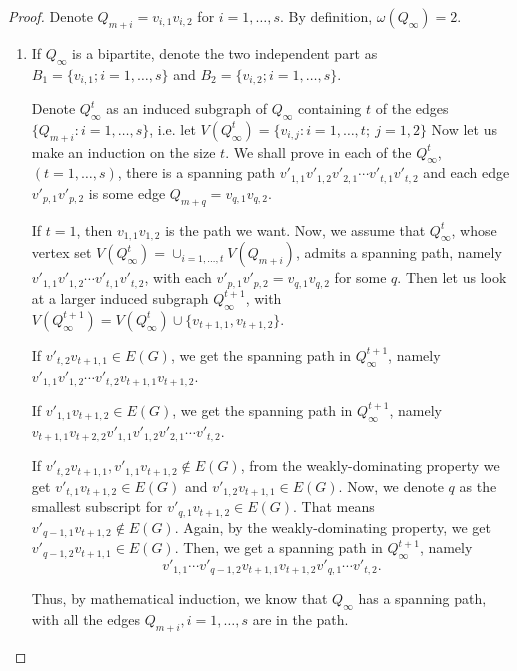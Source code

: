 \documentclass{amsart}
\theoremstyle{definition}
\begin{document}
\begin{proof}
Denote $Q_{m+i}=v_{i,1}v_{i,2}$ for $i=1,\ldots,s$. By definition, $\omega(Q_{\infty})=2$.
\begin{enumerate}
\item If $Q_{\infty}$ is a bipartite, denote the two independent part as $B_1=\{v_{i,1};i=1,\ldots,s\}$ and $B_2=\{v_{i,2};i=1,\ldots,s\}$. 


Denote $Q^t_{\infty}$ as an induced subgraph of $Q_{\infty}$ containing $t$ of the edges $\{Q_{m+i}:i=1,\ldots,s\}$, i.e. let $V(Q^t_{\infty})=\{v_{i,j}:i=1,\ldots,t;~j=1,2\}$
Now let us make an induction on the size $t$. We shall prove in each of the $Q^t_{\infty}$, $(t=1,\ldots,s)$, there is a spanning path $v'_{1,1}v'_{1,2}v'_{2,1}\cdots v'_{t,1}v'_{t,2}$ and each edge $v'_{p,1}v'_{p,2}$ is some edge $Q_{m+q}=v_{q,1}v_{q,2}$.


If $t=1$, then $v_{1,1}v_{1,2}$ is the path we want. Now, we assume that $Q^t_{\infty}$, whose vertex set $V(Q^t_{\infty})=\cup_{i=1,\ldots,t}V(Q_{m+i})$, admits a spanning path, namely $v'_{1,1}v'_{1,2}\cdots v'_{t,1}v'_{t,2}$, with each $v'_{p,1}v'_{p,2}=v_{q,1}v_{q,2}$ for some $q$. Then let us look at a larger induced subgraph $Q^{t+1}_{\infty}$, with $V(Q^{t+1}_{\infty})=V(Q^t_{\infty})\cup\{v_{t+1,1},v_{t+1,2}\}$.

If $v'_{t,2}v_{t+1,1}\in E(G)$, we get the spanning path in $Q^{t+1}_{\infty}$, 
namely\\ $v'_{1,1} v'_{1,2}\cdots v'_{t,2} v_{t+1,1} v_{t+1,2}$.

If $v'_{1,1}v_{t+1,2}\in E(G)$, we get the spanning path in $Q^{t+1}_{\infty}$, 
namely\\ $v_{t+1,1} v_{t+2,2} v'_{1,1} v'_{1,2} v'_{2,1}\cdots v'_{t,2}$.

If $v'_{t,2}v_{t+1,1},v'_{1,1}v_{t+1,2}\not\in E(G)$, from the weakly-dominating property we get $v'_{t,1}v_{t+1,2}\in E(G)$ and $v'_{1,2}v_{t+1,1}\in E(G)$. Now, we denote $q$ as the smallest subscript for $v'_{q,1}v_{t+1,2}\in E(G)$. That means $v'_{q-1,1}v_{t+1,2}\not\in E(G)$. Again, by the weakly-dominating property, we get $v'_{q-1,2}v_{t+1,1}\in E(G)$. Then, we get a spanning path in $Q^{t+1}_{\infty}$, namely $$v'_{1,1}\cdots v'_{q-1,2}v_{t+1,1}v_{t+1,2}v'_{q,1}\cdots v'_{t,2}.$$

Thus, by mathematical induction, we know that $Q_{\infty}$ has a spanning path, with all the edges $Q_{m+i},i=1,\ldots,s$ are in the path.


\end{enumerate}
\end{proof}
\end{document}
